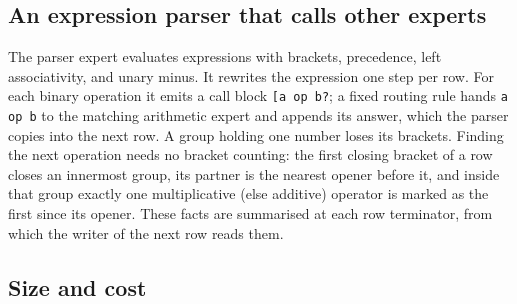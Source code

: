 \documentclass[10pt]{article}
\begin{document}
\subsection{An expression parser that calls other experts}
\label{sec:parser}
The parser expert evaluates expressions with brackets, precedence, left associativity, and
unary minus. It rewrites the expression one step per row. For each binary operation it emits a
call block \texttt{[a op b?}; a fixed routing rule hands \texttt{a op b} to the matching arithmetic expert
and appends its answer, which the parser copies into the next row. A group holding one number
loses its brackets. Finding the next operation needs no bracket counting: the first closing
bracket of a row closes an innermost group, its partner is the nearest opener before it, and
inside that group exactly one multiplicative (else additive) operator is marked as the first
since its opener. These facts are summarised at each row terminator, from which the writer of the
next row reads them.

\subsection{Size and cost}
\label{app:cost}
\end{document}

